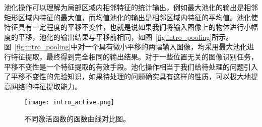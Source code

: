 池化操作可以理解为局部区域内相邻特征的统计输出，例如最大池化的输出是相邻矩形区域内特征的最大值，而均值池化的输出是相邻区域内特征的平均值。池化使特征具有一定程度的平移不变性，也就是说如果我们将输入图像上的物体进行小幅度的平移，池化的输出结果与平移前相同，如图~\ref{fig:intro_pooling}所示。图~\ref{fig:intro_pooling}中对一个具有微小平移的两幅输入图像，均采用最大池化进行特征提取，最终得到完全相同的输出结果。对于一些位置无关的图像识别任务，平移不变性是一个特征提取的有效手段。池化操作相当于我们给待处理的问题引入了平移不变性的先验知识，如果待处理的问题确实具有这样的性质，可以极大地提高网络的特征提取能力。

\begin{figure}
\centering
\texttt{[image: intro\_active.png]}
\caption{不同激活函数的函数曲线对比图。}
\label{fig:intro_active}
\end{figure}

